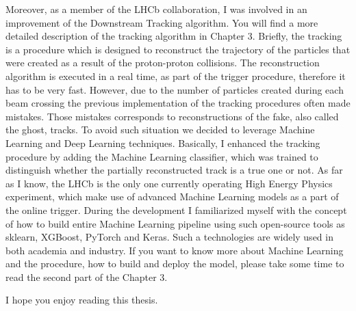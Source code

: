 Moreover, as a member of the LHCb collaboration, I was involved in an improvement of the Downstream Tracking algorithm. You will find a more detailed description of the tracking algorithm in Chapter 3. Briefly, the tracking is a procedure which is designed to reconstruct the trajectory of the particles that were created as a result of the proton-proton collisions. The reconstruction algorithm is executed in a real time, as part of the trigger procedure, therefore it has to be very fast. However, due to the number of particles created during each beam crossing the previous implementation of the tracking procedures often made mistakes. Those mistakes corresponds to reconstructions of the fake, also called the ghost, tracks. To avoid such situation we decided to leverage Machine Learning and Deep Learning techniques. Basically, I enhanced the tracking procedure by adding the Machine Learning classifier, which was trained to distinguish whether the partially reconstructed track is a true one or not. As far as I know, the LHCb is the only one currently operating High Energy Physics experiment, which make use of advanced Machine Learning models as a part of the online trigger. During the development I familiarized myself with the concept of how to build entire Machine Learning pipeline using such open-source tools as sklearn, XGBoost, PyTorch and Keras. Such a technologies are widely used in both academia and industry. If you want to know more about Machine Learning and the procedure, how to build and deploy the model, please take some time to read the second part of the Chapter 3. 


I hope you enjoy reading this thesis. 

